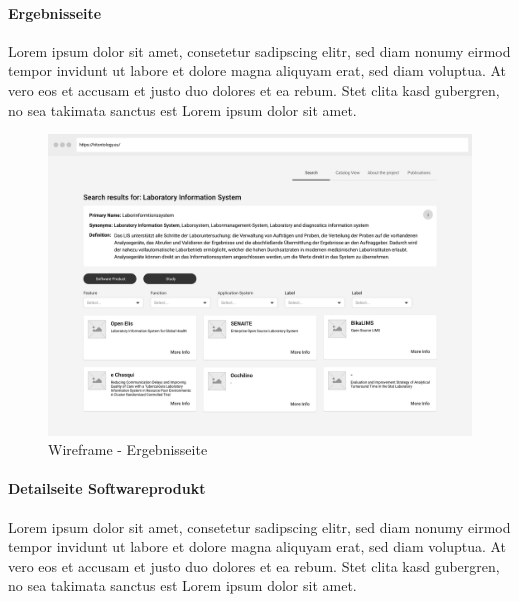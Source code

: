 \paragraph{Ergebnisseite}

Lorem ipsum dolor sit amet, consetetur sadipscing elitr, sed diam nonumy eirmod tempor invidunt ut labore et dolore magna aliquyam erat, sed diam voluptua. 
At vero eos et accusam et justo duo dolores et ea rebum. 
Stet clita kasd gubergren, no sea takimata sanctus est Lorem ipsum dolor sit amet.

\begin{figure}[H]
	\centering
    	\includegraphics[width=\textwidth]{Images/Wireframe_Ergebnisseite}
   	\caption{Wireframe - Ergebnisseite}
   	\label{fig:wireframe_results}
\end{figure}

\paragraph{Detailseite Softwareprodukt}

Lorem ipsum dolor sit amet, consetetur sadipscing elitr, sed diam nonumy eirmod tempor invidunt ut labore et dolore magna aliquyam erat, sed diam voluptua. 
At vero eos et accusam et justo duo dolores et ea rebum. 
Stet clita kasd gubergren, no sea takimata sanctus est Lorem ipsum dolor sit amet.

